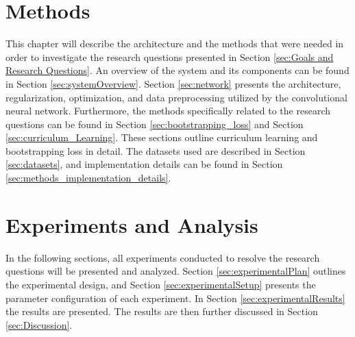 \documentclass[a4paper]{book}
\begin{document}
\chapter{Methods}
\label{cha:architectureAndModel}
This chapter will describe the architecture and the methods that were needed in order to investigate the research questions presented in Section \ref{sec:Goals and Research Questions}. An overview of the system and its components can be found in Section \ref{sec:systemOverview}. Section \ref{sec:network} presents the architecture, regularization, optimization, and data preprocessing utilized by the convolutional neural network. Furthermore, the methods specifically related to the research questions can be found in Section \ref{sec:bootstrapping_loss} and Section \ref{sec:curriculum_Learning}. These sections outline curriculum learning and bootstrapping loss in detail. The datasets used are described in Section \ref{sec:datasets}, and implementation details can be found in Section \ref{sec:methods_implementation_details}.














\chapter{Experiments and Analysis}
In the following sections, all experiments conducted to resolve the research questions will be presented and analyzed. Section \ref{sec:experimentalPlan} outlines the experimental design, and Section \ref{sec:experimentalSetup} presents the parameter configuration of each experiment. In Section \ref{sec:experimentalResults} the results are presented. The results are then further discussed in Section \ref{sec:Discussion}.
\label{cha:ResearchAndResults}








\end{document}
